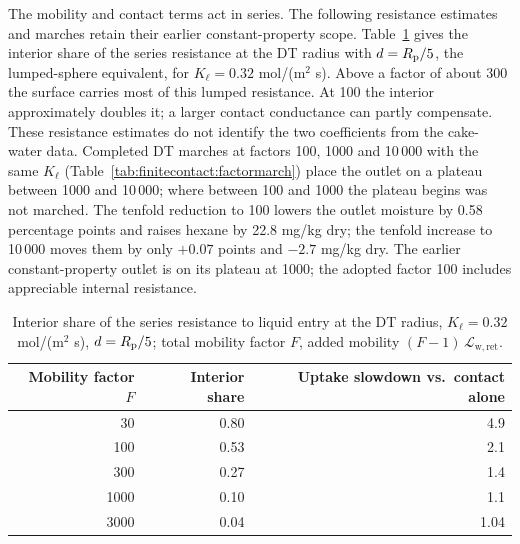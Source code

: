 The mobility and contact terms act in series. The following resistance
estimates and marches retain their earlier constant-property scope.
Table~\ref{tab:finitecontact:factor}
gives the interior share of the series resistance at the DT radius with
$d=R_{\mathrm{p}}/5$, the lumped-sphere equivalent, for $K_\ell=0.32$ mol/(m$^2$ s).
Above a factor of about 300 the surface carries most of this lumped
resistance. At 100 the interior approximately doubles it; a larger
contact conductance can partly compensate. These resistance estimates
do not identify the two coefficients from the cake-water data.
Completed DT marches at factors
100, 1000 and 10\,000 with the same $K_\ell$
(Table~\ref{tab:finitecontact:factormarch}) place the outlet on a plateau
between 1000 and 10\,000; where between 100 and 1000 the plateau begins
was not marched. The tenfold
reduction to 100 lowers the outlet moisture by 0.58 percentage points
and raises hexane by 22.8 mg/kg dry; the tenfold increase to
10\,000 moves them by only $+0.07$ points and $-2.7$ mg/kg dry. The earlier
constant-property outlet is on its plateau at 1000; the adopted factor
100 includes appreciable internal resistance.

\begin{table}[htbp]\centering\small
\caption{Interior share of the series resistance to liquid entry at the
DT radius, $K_\ell=0.32$ mol/(m$^2$ s), $d=R_{\mathrm{p}}/5$; total mobility factor
$F$, added mobility $(F-1)\,\mathcal L_{\mathrm{w,ret}}$.}
\label{tab:finitecontact:factor}
\begin{tabular}{@{}rrr@{}}\toprule
Mobility factor $F$ & Interior share & Uptake slowdown vs.\ contact alone\\\midrule
30 & 0.80 & 4.9\\
100 & 0.53 & 2.1\\
300 & 0.27 & 1.4\\
1000 & 0.10 & 1.1\\
3000 & 0.04 & 1.04\\
\bottomrule\end{tabular}\end{table}

